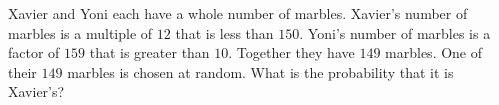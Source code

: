 Xavier and Yoni each have a whole number of marbles. Xavier's number of marbles is a multiple of $12$ that is less than $150$. Yoni's number of marbles is a factor of $159$ that is greater than $10$. Together they have $149$ marbles. One of their $149$ marbles is chosen at random. What is the probability that it is Xavier's?

